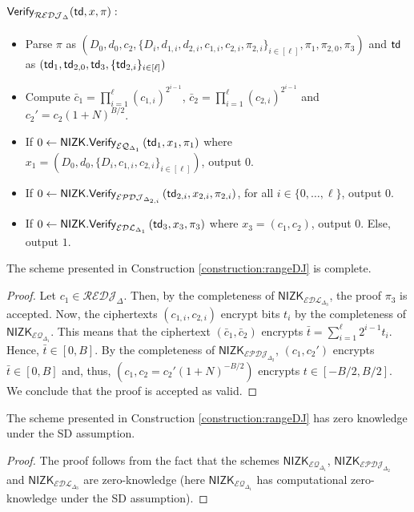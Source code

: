 \begin{construction}
 \paragraph{$\mathsf{Verify}_{\mathcal{REDJ}_{\Delta}}(\mathsf{td},x,\pi):$}
  \begin{itemize}
  \item Parse $\pi$ as $(D_0,d_0,c_2,\{D_i,d_{1,i},d_{2,i},c_{1,i},c_{2,i},\pi_{2,i}\}_{i\in [\ell]},\pi_1,\pi_{2,0},\pi_3)$ and $\mathsf{td}$ as $(\mathsf{td}_1,\mathsf{td}_{2,0},\mathsf{td}_3,\{\mathsf{td}_{2,i}\}_{i\in [\ell]})$
  \item Compute $\bar c_1=\prod_{i=1}^\ell (c_{1,i})^{2^{i-1}}$, $\bar c_2=\prod_{i=1}^\ell (c_{2,i})^{2^{i-1}}$ and $c_2'=c_2(1+N)^{B/2}$.
  \item If $0\leftarrow\mathsf{NIZK.Verify}_{\mathcal{EQ}_{\Delta_1}}\left(\mathsf{td}_1, x_1,\pi_1\right)$ where $ x_1=(D_0,d_0,\{D_i,c_{1,i},c_{2,i}\}_{i\in [\ell]})$, output $0$.
  \item If $0\leftarrow\mathsf{NIZK.Verify}_{\mathcal{EPDJ}_{\Delta_{2,i}}}\left(\mathsf{td}_{2,i}, x_{2,i},\pi_{2,i}\right)$, for all $i\in \{0, \dots, \ell\}$, output $0$.
  \item If $0\leftarrow\mathsf{NIZK.Verify}_{\mathcal{EDL}_{\Delta_1}}\left(\mathsf{td}_3, x_3,\pi_3\right)$ where $x_3=(c_1,c_2)$, output $0$. Else, output $1$.
 \end{itemize}
\end{construction}

\begin{lemma}
\label{lemma:completerangeDJ}
The scheme presented in Construction \ref{construction:rangeDJ} is complete.
\end{lemma}
\begin{proof}
Let $c_1\in\mathcal{REDJ}_\Delta$. Then, by the completeness of $\mathsf{NIZK}_{\mathcal{EDL}_{\Delta_3}}$, the proof $\pi_3$ is accepted. Now, the ciphertexts $(c_{1,i},c_{2,i})$ encrypt bits $t_i$ by the completeness of $\mathsf{NIZK}_{\mathcal{EQ}_{\Delta_1}}$. This means that the ciphertext $(\bar c_1,\bar c_2)$ encrypts $\bar t=\sum_{i=1}^\ell 2^{i-1}t_i$. Hence, $\bar t\in [0,B]$. By the completeness of $\mathsf{NIZK}_{\mathcal{EPDJ}_{\Delta_2}}$, $(c_1,c_2')$ encrypts $\bar t \in [0,B]$ and, thus, $(c_1,c_2=c_2'(1+N)^{-B/2})$ encrypts $t\in [-B/2,B/2]$. We conclude that the proof is accepted as valid. 

\end{proof}

\begin{lemma}
\label{lemma:zkrangeDJ}
The scheme presented in Construction \ref{construction:rangeDJ} has zero knowledge under the SD assumption.
\end{lemma}
\begin{proof}
The proof follows from the fact that the schemes $\mathsf{NIZK}_{\mathcal{EQ}_{\Delta_1}}$, $\mathsf{NIZK}_{\mathcal{EPDJ}_{\Delta_2}}$ and $\mathsf{NIZK}_{\mathcal{EDL}_{\Delta_3}}$ are zero-knowledge (here $\mathsf{NIZK}_{\mathcal{EQ}_{\Delta_1}}$ has computational zero-knowledge under the SD assumption).

\end{proof}


